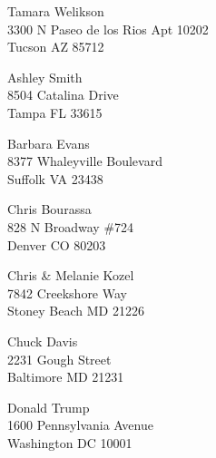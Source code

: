 \documentclass{article}
\begin{document}
\begin{center}
\begin{Huge}
\clearpage

\vspace*{\fill}
Tamara Welikson\\
3300 N Paseo de los Rios Apt 10202\\
Tucson AZ 85712\\
\vspace{\fill}

\clearpage

\vspace*{\fill}
Ashley Smith\\
8504 Catalina Drive\\
Tampa FL 33615\\
\vspace{\fill}

\clearpage

\vspace*{\fill}
Barbara Evans\\
8377 Whaleyville Boulevard\\
Suffolk VA 23438\\
\vspace{\fill}

\clearpage

\vspace*{\fill}
Chris Bourassa\\
828 N Broadway \#724\\
Denver CO 80203\\
\vspace{\fill}

\clearpage

\vspace*{\fill}
Chris \& Melanie Kozel\\
7842 Creekshore Way\\
Stoney Beach MD 21226\\
\vspace{\fill}

\clearpage

\vspace*{\fill}
Chuck Davis\\
2231 Gough Street\\
Baltimore MD 21231\\
\vspace{\fill}

\clearpage

\vspace*{\fill}
Donald Trump\\
1600 Pennsylvania Avenue\\
Washington DC 10001\\
\vspace{\fill}


\end{Huge}
\end{center}
\end{document}
